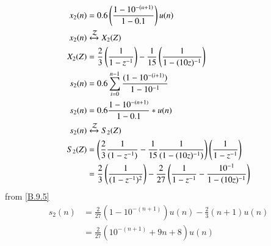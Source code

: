 \documentclass[journal,12pt,twocolumn]{IEEEtran}
\theoremstyle{remark}
\begin{document}
\begin{align}
x_2(n) &= 0.6 \left(\frac{1-10^{-(n+1)}}{1-0.1}\right)u(n)\\
x_2(n) & \xleftrightarrow{\mathcal{Z}} X_2(Z)\\
X_2(Z) &= \frac{2}{3}\left(\frac{1}{1-z^{-1}}\right)-\frac{1}{15}\left(\frac{1}{1-(10z)^{-1}}\right)\\
s_2(n) &= 0.6 \sum_{i=0}^{n-1} \frac{(1-10^{-(i+1)})}{1-10^{-1}}\\
s_2(n) &= 0.6 \frac{1-10^{-(n+1)}}{1-0.1}*u(n)\\
s_2(n) & \xleftrightarrow{\mathcal{Z}} S_2(Z)\\
S_2(Z) &= \left(\frac{2}{3}\frac{1}{(1-z^{-1})}-\frac{1}{15}\frac{1}{(1-(10z)^{-1})}\right)\left(\frac{1}{1-z^{-1}}\right)\\
   &=\frac{2}{3}\left(\frac{1}{(1-z^{-1})^2}\right)-\frac{2}{27}\left(\frac{1}{1-z^{-1}}-\frac{10^{-1}}{1-(10z)^{-1}}\right)\\
 \end{align}
   from \eqref{B.9.5}
\begin{align}
s_2(n) &=\frac{2}{27}(1-10^{-(n+1)})u(n)-\frac{2}{3}(n+1)u(n)\\
       &= \frac{2}{27}(10^{-(n+1)}+9n+8)u(n)
\end{align}
\end{document}

